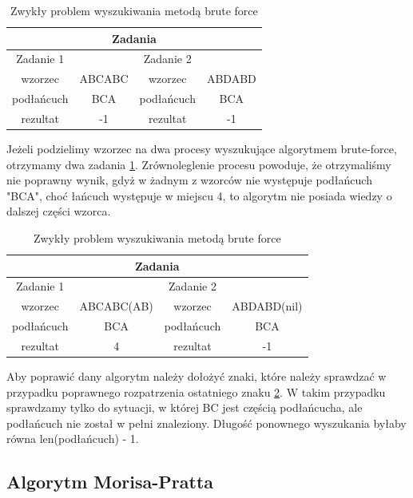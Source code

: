 \begin{table}
  \centering
  \begin{tabular}{ |c|c||c|c|  } 
    \hline
    \multicolumn{4}{|c|}{Zadania} \\
    \hline
    Zadanie 1 & & Zadanie 2 & \\
    \hline
    wzorzec & ABCABC & wzorzec & ABDABD \\
    \hline
    podłańcuch & BCA & podłańcuch & BCA \\
    \hline
    rezultat & -1 & rezultat & -1 \\ 
    \hline
  \end{tabular}
  \caption{Zwykły problem wyszukiwania metodą brute force}
  \label{tabela:splitTasksBruteForce}
\end{table}

Jeżeli podzielimy wzorzec na dwa procesy wyszukujące algorytmem brute-force,
otrzymamy dwa zadania \ref{tabela:splitTasksBruteForce}. Zrównoleglenie procesu 
powoduje, że otrzymaliśmy nie poprawny wynik, gdyż w żadnym z wzorców nie
występuje podłańcuch "BCA", choć łańcuch występuje w miejscu 4, to algorytm nie
posiada wiedzy o dalszej części wzorca.

\begin{table}
  \centering
  \begin{tabular}{ |c|c||c|c|  } 
    \hline
    \multicolumn{4}{|c|}{Zadania} \\
    \hline
    Zadanie 1 & & Zadanie 2 & \\
    \hline
    wzorzec & ABCABC(AB) & wzorzec & ABDABD(nil) \\
    \hline
    podłańcuch & BCA & podłańcuch & BCA \\
    \hline
    rezultat & 4 & rezultat & -1 \\ 
    \hline
  \end{tabular}
  \caption{Zwykły problem wyszukiwania metodą brute force}
  \label{tabela:splitBruteForceCorrected}
\end{table}

Aby poprawić dany algorytm należy dołożyć znaki, które należy sprawdzać w 
przypadku poprawnego rozpatrzenia ostatniego znaku 
\ref{tabela:splitBruteForceCorrected}. W takim przypadku sprawdzamy tylko do
sytuacji, w której BC jest częścią podłańcucha, ale podłańcuch nie został w 
pełni znaleziony. Długość ponownego wyszukania byłaby równa len(podłańcuch) - 1.


\subsection{Algorytm Morisa-Pratta}

